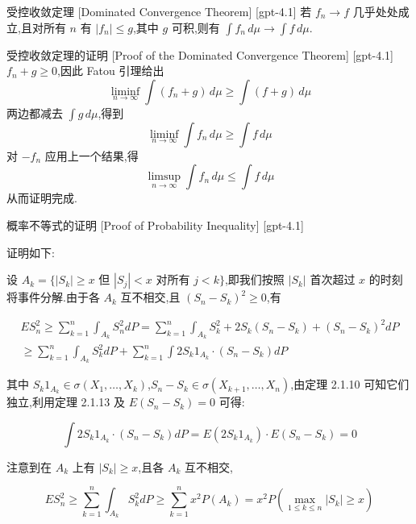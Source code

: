 \documentclass[UTF8]{ctexart}
\begin{document}
    
    
    \begin{thm}
        {受控收敛定理}
        [Dominated Convergence Theorem]
        [gpt-4.1]
        若 $f_{n} \to f$ 几乎处处成立,且对所有 $n$ 有 $|f_{n}| \leq g$,其中 $g$ 可积,则有 $\int f_{n} \, d\mu \to \int f \, d\mu$.
    \end{thm}
    
    
    
    \begin{prf}
        {受控收敛定理的证明}
        [Proof of the Dominated Convergence Theorem]
        [gpt-4.1]
        $f_{n} + g \geq 0$,因此 Fatou 引理给出
\[
\liminf_{n \to \infty} \int (f_{n} + g) \, d\mu \geq \int (f + g) \, d\mu
\]
两边都减去 $\int g \, d\mu$,得到
\[
\liminf_{n \to \infty} \int f_{n} \, d\mu \geq \int f \, d\mu
\]
对 $-f_{n}$ 应用上一个结果,得
\[
\limsup_{n \to \infty} \int f_{n} \, d\mu \leq \int f \, d\mu
\]
从而证明完成.
    \end{prf}
    
    
    
    \begin{prf}
        {概率不等式的证明}
        [Proof of Probability Inequality]
        [gpt-4.1]
        
证明如下:

设 $A_{k} = \{ |S_{k}| \ge x$ 但 $|S_{j}| < x$ 对所有 $j < k \}$,即我们按照 $|S_{k}|$ 首次超过 $x$ 的时刻将事件分解.由于各 $A_{k}$ 互不相交,且 $(S_{n} - S_{k})^{2} \ge 0$,有

\[
\begin{array}{l}
E S_{n}^{2} \geq \sum_{k=1}^{n} \int_{A_{k}} S_{n}^{2} dP = \sum_{k=1}^{n} \int_{A_{k}} S_{k}^{2} + 2 S_{k} (S_{n} - S_{k}) + (S_{n} - S_{k})^{2} dP \\
\geq \sum_{k=1}^{n} \int_{A_{k}} S_{k}^{2} dP + \sum_{k=1}^{n} \int 2 S_{k} 1_{A_{k}} \cdot (S_{n} - S_{k}) dP
\end{array}
\]

其中 $S_{k} 1_{A_{k}} \in \sigma(X_{1}, \ldots, X_{k})$,$S_{n} - S_{k} \in \sigma(X_{k+1}, \ldots, X_{n})$,由定理 2.1.10 可知它们独立,利用定理 2.1.13 及 $E(S_{n} - S_{k}) = 0$ 可得:

\[
\int 2 S_{k} 1_{A_{k}} \cdot (S_{n} - S_{k}) dP = E(2 S_{k} 1_{A_{k}}) \cdot E(S_{n} - S_{k}) = 0
\]

注意到在 $A_{k}$ 上有 $|S_{k}| \geq x$,且各 $A_{k}$ 互不相交,

\[
E S_{n}^{2} \geq \sum_{k=1}^{n} \int_{A_{k}} S_{k}^{2} dP \geq \sum_{k=1}^{n} x^{2} P(A_{k}) = x^{2} P\left(\max_{1 \leq k \leq n} |S_{k}| \geq x\right)
\]

    \end{prf}
    
\end{document}
